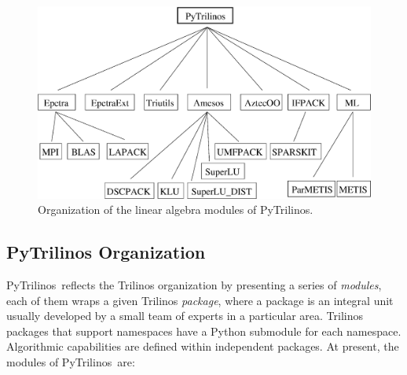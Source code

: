 \documentclass[acmtocl]{acmtrans2m}
\newcommand{\PyTrilinos}{{PyTrilinos}}
\begin{document}
\begin{figure}
\begin{center}
\includegraphics[width=12cm]{organization.eps}
\caption{Organization of the linear algebra modules of PyTrilinos.}
\label{fig:organization}
\end{center}
\end{figure}

\subsection{PyTrilinos Organization}
\label{sec:organization}

\PyTrilinos\ reflects the Trilinos organization by presenting a series
of {\sl modules}, each of them wraps a given Trilinos {\sl package},
 where a package is an integral unit usually
developed by a small team of experts in a particular area.
Trilinos packages that support namespaces have a Python submodule for
each namespace.  Algorithmic capabilities are defined within
independent packages. At present, the modules of \PyTrilinos\ are:
\end{document}
